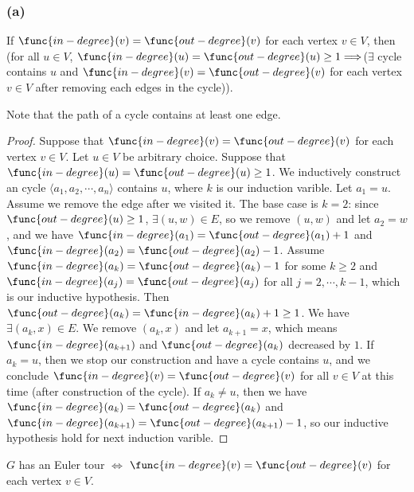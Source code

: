 \subsubsection*{(a)}

\begin{lemma}
    If $\func{in-degree}(v) = \func{out-degree}(v)$
    for each vertex $v \in V$,
    then (for all $u \in V$, 
    $\func{in-degree}(u) = \func{out-degree}(u) \geq 1
    \Longrightarrow
    $($\exists$ cycle contains $u$ and 
    $\func{in-degree}(v) = \func{out-degree}(v)$
    for each vertex $v \in V$
    after removing each edges in the cycle)).
\end{lemma}

Note that the path of a cycle contains at least one edge.

\begin{proof}
    Suppose that $\func{in-degree}(v) = \func{out-degree}(v)$
    for each vertex $v \in V$.
    Let $u \in V$ be arbitrary choice.
    Suppose that $\func{in-degree}(u) = \func{out-degree}(u) \geq 1$.
    We inductively construct an cycle 
    $\langle a_1, a_2, \cdots, a_n \rangle$ 
    contains $u$, where $k$ is our induction varible.
    Let $a_1 = u$.
    Assume we remove the edge after we visited it.
    The base case is $k = 2$:
    since $\func{out-degree}(u) \geq 1$,
    $\exists (u,w) \in E$,
    so we remove $(u,w)$ and let $a_2 = w$,
    and we have $\func{in-degree}(a_1) = \func{out-degree}(a_1) + 1$
    and $\func{in-degree}(a_2) = \func{out-degree}(a_2) - 1$.
    Assume $\func{in-degree}(a_k) = \func{out-degree}(a_k) - 1$
    for some $k \geq 2$
    and $\func{in-degree}(a_j) = \func{out-degree}(a_j)$
    for all $j = 2, \cdots, k-1$,
    which is our inductive hypothesis.
    Then $\func{out-degree}(a_k) = \func{in-degree}(a_k) + 1 \geq 1$.
    We have $\exists (a_k,x) \in E$.
    We remove $(a_k,x)$ and let $a_{k+1} = x$,
    which means $\func{in-degree}(a_{k+1})$ and
    $\func{out-degree}(a_k)$ decreased by $1$.
    If $a_k = u$, then we stop our construction and have a cycle
    contains $u$, and we conclude 
    $\func{in-degree}(v) = \func{out-degree}(v)$
    for all $v \in V$ at this time (after construction of the cycle).
    If $a_k \neq u$, 
    then we have $\func{in-degree}(a_k) = \func{out-degree}(a_k)$
    and $\func{in-degree}(a_{k+1}) = \func{out-degree}(a_{k+1}) - 1$,
    so our inductive hypothesis hold for next induction varible.
\end{proof}

\begin{claim}
    $G$ has an Euler tour
    $\Longleftrightarrow$
    $\func{in-degree}(v) = \func{out-degree}(v)$
    for each vertex $v \in V$.
\end{claim}

